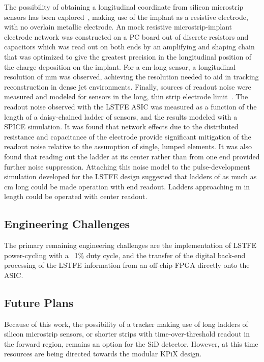 The possibility of obtaining a longitudinal coordinate from silicon
microstrip sensors has been explored~\cite{Carman2011118}, making use of the
implant as a resistive electrode, with no overlain metallic electrode. An mock resistive
microstrip-implant electrode network was constructed on a PC board out of discrete resistors and capacitors
which was read out on both ends by an amplifying and shaping chain that was optimized to give the greatest
precision in the longitudinal position of the charge deposition on the implant. For a \unit[10]{cm}-long sensor,
a longitudinal resolution of \unit[6]{mm} was observed, achieving the resolution needed to aid in tracking
reconstruction in dense jet environments. Finally, sources of readout noise were measured and modeled
for sensors in the long, thin strip electrode limit~\cite{Collier2013127}. The readout noise observed
with the LSTFE ASIC was measured as a function of the length of a daisy-chained ladder of sensors,
and the results modeled with a SPICE simulation. It was found that network effects due to the
distributed resistance and capacitance of the electrode provide significant
mitigation of the readout noise relative to the assumption of single, lumped elements. It
was also found that reading out the ladder at its center rather than from one end provided
further noise suppression. Attaching this noise model to the pulse-development simulation
developed for the LSTFE design suggested that ladders of as much as \unit[75]{cm} long could be
made operation with end readout. Ladders approaching \unit[1]{m} in length could be operated with center readout.

\subsection{Engineering Challenges}

The primary remaining engineering challenges are the implementation of LSTFE power-cycling with a ~1\%
duty cycle, and the transfer of the digital back-end processing of the LSTFE information from
an off-chip FPGA directly onto the ASIC.

\subsection{Future Plans}

Because of this work, the possibility of a tracker making use of long ladders of silicon
microstrip sensors, or shorter strips with time-over-threshold readout in the forward
region, remains an option for the SiD detector. However, at this time resources are
being directed towards the modular KPiX design.

